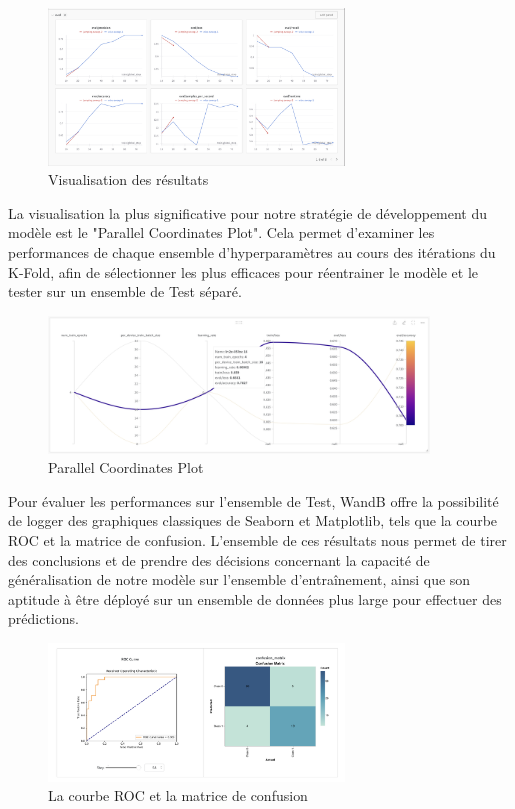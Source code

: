 \documentclass{article}
\begin{document}
\begin{figure}[!htbp]
    \centering
    \includegraphics[width=0.7\textwidth]{plots.png}
    \caption{Visualisation des résultats}
    \label{fig:plots}
\end{figure}

La visualisation la plus significative pour notre stratégie de développement du modèle est le "Parallel Coordinates Plot". Cela permet d'examiner les performances de chaque ensemble d'hyperparamètres au cours des itérations du K-Fold, afin de sélectionner les plus efficaces pour réentrainer le modèle et le tester sur un ensemble de Test séparé.

\begin{figure}[!htbp]
    \centering
    \includegraphics[width=0.9\textwidth]{sweep.png}
    \caption{Parallel Coordinates Plot}
    \label{fig:sweep}
\end{figure}

Pour évaluer les performances sur l'ensemble de Test, WandB offre la possibilité de logger des graphiques classiques de Seaborn et Matplotlib, tels que la courbe ROC et la matrice de confusion. L'ensemble de ces résultats nous permet de tirer des conclusions et de prendre des décisions concernant la capacité de généralisation de notre modèle sur l'ensemble d'entraînement, ainsi que son aptitude à être déployé sur un ensemble de données plus large pour effectuer des prédictions.

\begin{figure}[!htbp]
    \centering
    \includegraphics[width=0.7\textwidth]{roc_mtrx.png}
    \caption{La courbe ROC et la matrice de confusion}
    \label{fig:roc_mtrx}
\end{figure}
\end{document}
